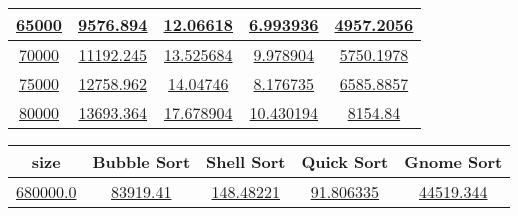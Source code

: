 \begin{lrbox}{\sorttimealg}
\begin{tabular}{|c|c|c|c|c|}
\hline
{\href{T2.12.0}{65000}} & {\href{T2.12.1}{9576.894}} & {\href{T2.12.2}{12.06618}} & {\href{T2.12.3}{6.993936}} & {\href{T2.12.4}{4957.2056}}\\
\hline
{\href{T2.13.0}{70000}} & {\href{T2.13.1}{11192.245}} & {\href{T2.13.2}{13.525684}} & {\href{T2.13.3}{9.978904}} & {\href{T2.13.4}{5750.1978}}\\
\hline
{\href{T2.14.0}{75000}} & {\href{T2.14.1}{12758.962}} & {\href{T2.14.2}{14.04746}} & {\href{T2.14.3}{8.176735}} & {\href{T2.14.4}{6585.8857}}\\
\hline
{\href{T2.15.0}{80000}} & {\href{T2.15.1}{13693.364}} & {\href{T2.15.2}{17.678904}} & {\href{T2.15.3}{10.430194}} & {\href{T2.15.4}{8154.84}}\\

\hline
\end{tabular}
\end{lrbox}

\newsavebox{\sumtime}
\begin{lrbox}{\sumtime}
\begin{tabular}{|c|c|c|c|c|}
\hline
\textbf{size} & \textbf{Bubble Sort} & \textbf{Shell Sort} & \textbf{Quick Sort} & \textbf{Gnome Sort}\\
\hline\hline
{\href{T3.0.0}{680000.0}} & {\href{T3.0.1}{83919.41}} & {\href{T3.0.2}{148.48221}} & {\href{T3.0.3}{91.806335}} & {\href{T3.0.4}{44519.344}}\\

\hline
\end{tabular}
\end{lrbox}


